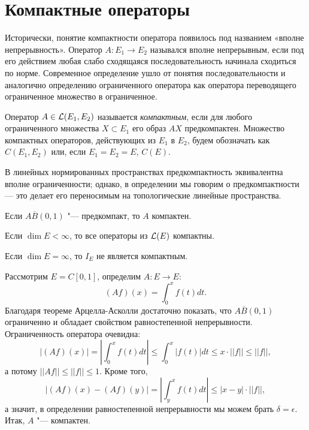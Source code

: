 \documentclass[main]{subfiles}
\begin{document}
\section{Компактные операторы}

Исторически, понятие компактности оператора
появилось под названием «вполне непрерывность».
Оператор \( A : E_1 \to E_2 \)
назывался вполне непрерывным, если
под его действием любая слабо сходящаяся последовательность
начинала сходиться по норме.
Современное определение ушло от понятия последовательности
и аналогично определению ограниченного оператора
как оператора переводящего ограниченное множество в ограниченное.

\begin{definition}
  Оператор \( A \in \Linears{E_1, E_2} \)
  называется \emph{компактным}, если
  для любого ограниченного множества \( X \subset E_1 \)
  его образ \( A X \) предкомпактен.
  Множество компактных операторов, действующих
  из \( E_1 \) в \( E_2 \), будем обозначать как
  \( C(E_1, E_2) \) или, если \( E_1 = E_2 = E \),
  \( C(E) \).
\end{definition}

\begin{remark}
  В линейных нормированных пространствах
  предкомпактность эквивалентна вполне ограниченности;
  однако, в определении мы говорим о предкомпактности —
  это делает его переносимым на топологические линейные пространства.
\end{remark}

\begin{exercise}
  Если \( A \overline{B}(0, 1) \) "--- предкомпакт,
  то \( A \) компактен.
\end{exercise}

\begin{example}
  Если \( \dim E < \infty \), то все операторы из
  \( \Linears{E} \) компактны.
\end{example}

\begin{example}
  Если \( \dim E = \infty \), то \( I_E \) не является компактным.
\end{example}

\begin{example}
  Рассмотрим \( E = C[0, 1] \), определим \( A : E \to E \):
  \[
    (Af)(x) = \int_0^x f(t) dt.
  \]
  Благодаря теореме Арцелла-Асколли достаточно показать, что
  \( A \overline{B}(0, 1) \) ограниченно и обладает
  свойством равностепенной непрерывности.
  Ограниченность оператора очевидна:
  \[
    |(Af)(x)| = |\int_0^x f(t) dt| \le
    \int_0^x |f(t)| dt \le x \cdot ||f|| \le ||f||,
  \]
  а потому \( ||Af|| \le ||f|| \le 1 \).
  Кроме того,
  \[
    |(Af)(x) - (Af)(y)| =
    \left|\int_y^x f(t) dt \right| \le |x - y| \cdot ||f||,
  \]
  а значит, в определении равностепенной непрерывности
  мы можем брать \( \delta = \epsilon \).
  Итак, \( A \) "--- компактен.
\end{example}
\end{document}
